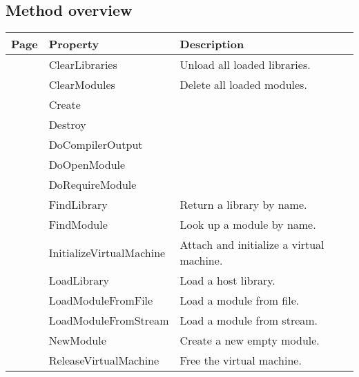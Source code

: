 \subsection{Method overview}
\label{thoriumcorepkg:thorium:tthorium:methods}
\begin{tabularx}{\textwidth}{llX}
Page & Property & Description  \\ \hline
\pageref{thoriumcorepkg:thorium:tthorium:clearlibraries} & ClearLibraries  & Unload all loaded libraries. \\
\pageref{thoriumcorepkg:thorium:tthorium:clearmodules} & ClearModules  & Delete all loaded modules. \\
\pageref{thoriumcorepkg:thorium:tthorium:create} & Create  &  \\
\pageref{thoriumcorepkg:thorium:tthorium:destroy} & Destroy  &  \\
\pageref{thoriumcorepkg:thorium:tthorium:docompileroutput} & DoCompilerOutput  &  \\
\pageref{thoriumcorepkg:thorium:tthorium:doopenmodule} & DoOpenModule  &  \\
\pageref{thoriumcorepkg:thorium:tthorium:dorequiremodule} & DoRequireModule  &  \\
\pageref{thoriumcorepkg:thorium:tthorium:findlibrary} & FindLibrary  & Return a library by name. \\
\pageref{thoriumcorepkg:thorium:tthorium:findmodule} & FindModule  & Look up a module by name. \\
\pageref{thoriumcorepkg:thorium:tthorium:initializevirtualmachine} & InitializeVirtualMachine  & Attach and initialize a virtual machine. \\
\pageref{thoriumcorepkg:thorium:tthorium:loadlibrary} & LoadLibrary  & Load a host library. \\
\pageref{thoriumcorepkg:thorium:tthorium:loadmodulefromfile} & LoadModuleFromFile  & Load a module from file. \\
\pageref{thoriumcorepkg:thorium:tthorium:loadmodulefromstream} & LoadModuleFromStream  & Load a module from stream. \\
\pageref{thoriumcorepkg:thorium:tthorium:newmodule} & NewModule  & Create a new empty module. \\
\pageref{thoriumcorepkg:thorium:tthorium:releasevirtualmachine} & ReleaseVirtualMachine  & Free the virtual machine. \\
\hline
\end{tabularx}
